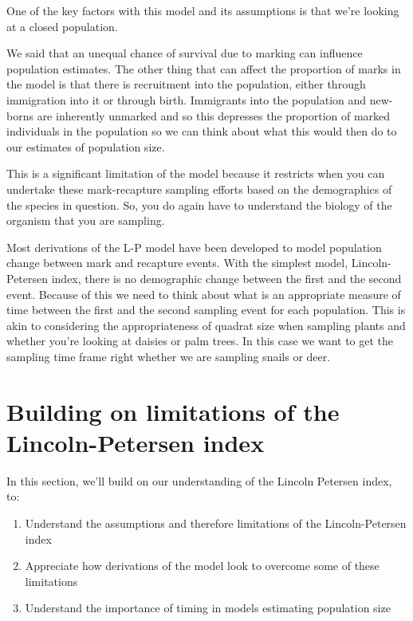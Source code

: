 \documentclass[
  letterpaper,
  DIV=11,
  numbers=noendperiod]{scrreprt}
\providecommand{\tightlist}{%
  \setlength{\itemsep}{0pt}\setlength{\parskip}{0pt}}
\begin{document}
One of the key factors with this model and its assumptions is that we're
looking at a closed population.

We said that an unequal chance of survival due to marking can influence
population estimates. The other thing that can affect the proportion of
marks in the model is that there is recruitment into the population,
either through immigration into it or through birth. Immigrants into the
population and new-borns are inherently unmarked and so this depresses
the proportion of marked individuals in the population so we can think
about what this would then do to our estimates of population size.

This is a significant limitation of the model because it restricts when
you can undertake these mark-recapture sampling efforts based on the
demographics of the species in question. So, you do again have to
understand the biology of the organism that you are sampling.

Most derivations of the L-P model have been developed to model
population change between mark and recapture events. With the simplest
model, Lincoln-Petersen index, there is no demographic change between
the first and the second event. Because of this we need to think about
what is an appropriate measure of time between the first and the second
sampling event for each population. This is akin to considering the
appropriateness of quadrat size when sampling plants and whether you're
looking at daisies or palm trees. In this case we want to get the
sampling time frame right whether we are sampling snails or deer.

\chapter{Building on limitations of the Lincoln-Petersen
index}\label{sec-limitations-lincoln-petersen}

In this section, we'll build on our understanding of the Lincoln
Petersen index, to:

\begin{enumerate}
\def\labelenumi{\arabic{enumi}.}
\tightlist
\item
  Understand the assumptions and therefore limitations of the
  Lincoln-Petersen index
\item
  Appreciate how derivations of the model look to overcome some of these
  limitations
\item
  Understand the importance of timing in models estimating population
  size
\end{enumerate}
\end{document}
